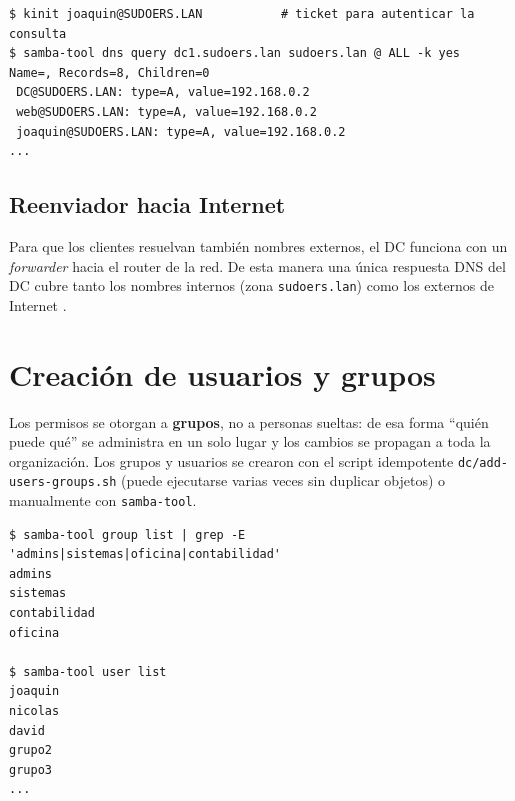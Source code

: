 \begin{lstlisting}[style=terminal]
$ kinit joaquin@SUDOERS.LAN           # ticket para autenticar la consulta
$ samba-tool dns query dc1.sudoers.lan sudoers.lan @ ALL -k yes
Name=, Records=8, Children=0
 DC@SUDOERS.LAN: type=A, value=192.168.0.2
 web@SUDOERS.LAN: type=A, value=192.168.0.2
 joaquin@SUDOERS.LAN: type=A, value=192.168.0.2
...
\end{lstlisting}


\subsection{Reenviador hacia Internet}

Para que los clientes resuelvan también nombres externos, el DC funciona con
un \textit{forwarder} hacia el router de la red. De esta manera una única
respuesta DNS del DC cubre tanto los nombres internos (zona
\texttt{sudoers.lan}) como los externos de Internet \citep{iscbind9}.

\section{Creación de usuarios y grupos}

Los permisos se otorgan a \textbf{grupos}, no a personas sueltas: de esa
forma ``quién puede qué'' se administra en un solo lugar y los cambios se
propagan a toda la organización. Los grupos y usuarios se crearon con el
script idempotente \texttt{dc/add-users-groups.sh} (puede ejecutarse varias
veces sin duplicar objetos) o manualmente con \texttt{samba-tool}.

\begin{lstlisting}[style=terminal]
$ samba-tool group list | grep -E 'admins|sistemas|oficina|contabilidad'
admins
sistemas
contabilidad
oficina

$ samba-tool user list
joaquin
nicolas
david
grupo2
grupo3
...
\end{lstlisting}


